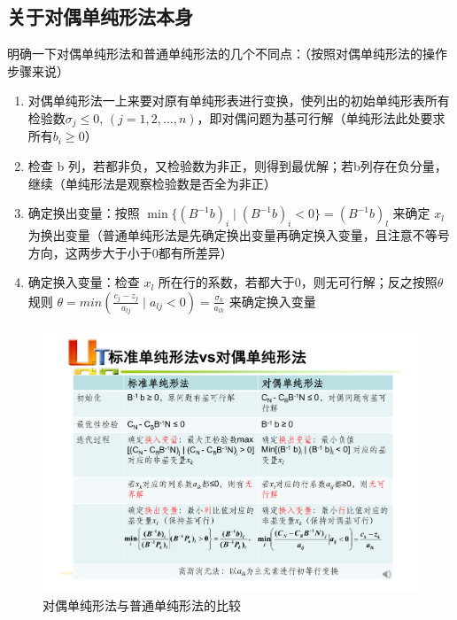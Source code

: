 \documentclass[]{report}
\begin{document}
		\subsection{关于对偶单纯形法本身}
		明确一下对偶单纯形法和普通单纯形法的几个不同点：（按照对偶单纯形法的操作步骤来说）\par
		\begin{enumerate}
			\item 对偶单纯形法一上来要对原有单纯形表进行变换，使列出的初始单纯形表所有检验数$\sigma_j ≤ 0,\,(j=1,2,…,n)$，即对偶问题为基可行解（单纯形法此处要求所有$b_i\ge0$）
			\item 检查 b 列，若都非负，又检验数为非正，则得到最优解；若b列存在负分量，继续（单纯形法是观察检验数是否全为非正）
			\item 确定换出变量：按照 $\min\{(B^{-1}b)_i\mid(B^{-1}b)_i<0\}=(B^{-1}b)_l$ 来确定 $x_l$ 为换出变量（普通单纯形法是先确定换出变量再确定换入变量，且注意不等号方向，这两步大于小于0都有所差异）
			\item 确定换入变量：检查 $x_l$ 所在行的系数，若都大于0，则无可行解；反之按照$\theta$规则 $\displaystyle\theta=min(\frac{c_j-z_j}{a_{lj}}\mid a_{lj}<0)=\frac{\sigma_k}{a_{lk}}$ 来确定换入变量
		\end{enumerate}\par
		\begin{figure}[h]
			\centering
			\begin{minipage}{40em}
				\centering
				\includegraphics[scale = 0.5]{pictures/DanChunXingFa.pdf}
				\caption{对偶单纯形法与普通单纯形法的比较}
			\end{minipage}
		\end{figure}\par
\end{document}
